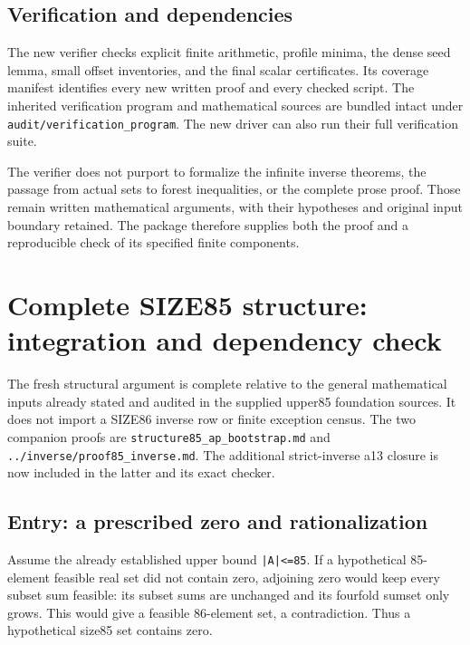 \documentclass[10pt,a4paper]{article}
\theoremstyle{definition}
\begin{document}
\subsection{Verification and dependencies}
The new verifier checks explicit finite arithmetic, profile minima, the dense
seed lemma, small offset inventories, and the final scalar certificates. Its
coverage manifest identifies every new written proof and every checked script.
The inherited verification program and mathematical sources are bundled intact
under \texttt{audit/verification\_program}. The new driver can also run their
full verification suite.

The verifier does not purport to formalize the infinite inverse theorems, the
passage from actual sets to forest inequalities, or the complete prose proof.
Those remain written mathematical arguments, with their hypotheses and
original input boundary retained. The package therefore supplies both the
proof and a reproducible check of its specified finite components.

\clearpage

\clearpage
\hypertarget{complete-size85-structure-integration-and-dependency-check}{%
\section{Complete SIZE85 structure: integration and dependency
check}\label{complete-size85-structure-integration-and-dependency-check}}

The fresh structural argument is complete relative to the general
mathematical inputs already stated and audited in the supplied upper85
foundation sources. It does not import a SIZE86 inverse row or finite
exception census. The two companion proofs are
\texttt{structure85\_\allowbreak{}\allowbreak{}ap\_\allowbreak{}\allowbreak{}bootstrap.md} and
\texttt{../\allowbreak{}inverse/\allowbreak{}proof85\_\allowbreak{}\allowbreak{}inverse.md}. The additional
strict-inverse a13 closure is now included in the latter and its exact
checker.

\hypertarget{entry-a-prescribed-zero-and-rationalization}{%
\subsection{Entry: a prescribed zero and
rationalization}\label{entry-a-prescribed-zero-and-rationalization}}

Assume the already established upper bound
\texttt{|A|<=\allowbreak{}85}. If a hypothetical 85-element feasible
real set did not contain zero,\allowbreak{} adjoining zero would keep every subset
sum feasible: its subset sums are unchanged and its fourfold sumset only
grows. This would give a feasible 86-element set,\allowbreak{} a contradiction. Thus
a hypothetical size85 set contains zero.
\end{document}
